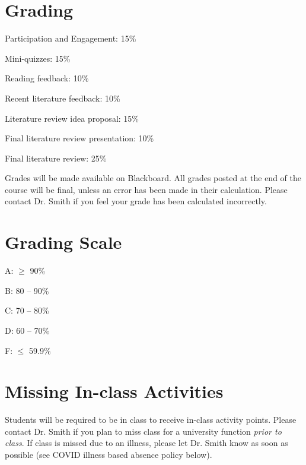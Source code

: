\documentclass[12pt, notitlepage]{article}   	%
\begin{document}
{\newpage

\section{Grading}
Participation and Engagement: 15\% \par
Mini-quizzes: 15\% \par
Reading feedback: 10\% \par
Recent literature feedback: 10\% \par
Literature review idea proposal: 15\% \par
Final literature review presentation: 10\% \par
Final literature review: 25\% \par

Grades will be made available on Blackboard. 
All grades posted at the end of the course will be final, 
unless an error has been made in their calculation.
Please contact Dr. Smith if you feel your grade has been calculated incorrectly.

\section{Grading Scale}
A: $\geq$ 90\% \par
B: 80 – 90\% \par
C: 70 – 80\% \par
D: 60 – 70\% \par
F: $\leq$ 59.9\% \par

\section{Missing In-class Activities}
Students will be required to be in class to receive in-class activity points. 
Please contact Dr. Smith if you plan to miss class for a university function 
\textit{prior to class}. If class is missed due to an illness, 
please let Dr. Smith know as soon as possible (see COVID illness based absence policy below).

}
\end{document}
